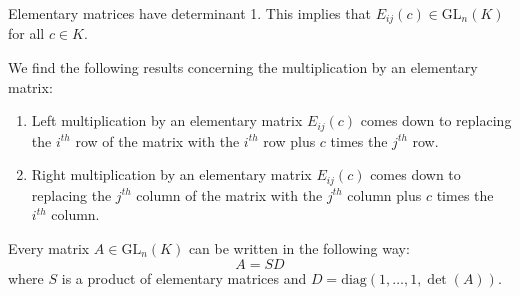     \begin{property}
        Elementary matrices have determinant 1. This implies that $E_{ij}(c)\in\text{GL}_n(K)$ for all $c\in K$.
    \end{property}
    \begin{property}
        We find the following results concerning the multiplication by an elementary matrix:
        \begin{enumerate}
            \item Left multiplication by an elementary matrix $E_{ij}(c)$ comes down to replacing the $i^{th}$ row of the matrix with the $i^{th}$ row plus $c$ times the $j^{th}$ row.
            \item Right multiplication by an elementary matrix $E_{ij}(c)$ comes down to replacing the $j^{th}$ column of the matrix with the $j^{th}$ column plus $c$ times the $i^{th}$ column.
        \end{enumerate}
    \end{property}

    \begin{property}\label{linalgebra:theorem:elementary_matrices}
        Every matrix $A\in\text{GL}_n(K)$ can be written in the following way: \[A = SD\] where $S$ is a product of elementary matrices and $D=\text{diag}(1,\dotso,1,\det(A))$.
    \end{property}

